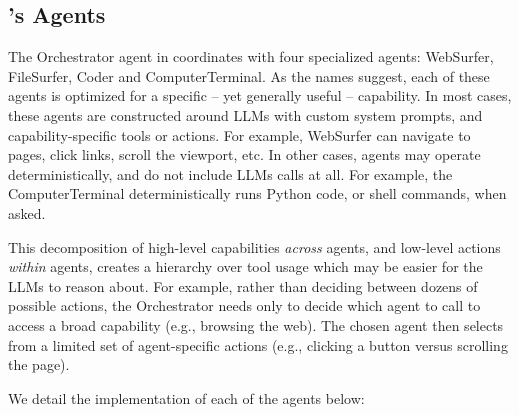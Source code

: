 \subsection{\team's Agents}


The Orchestrator agent in \team coordinates with four specialized agents: WebSurfer, FileSurfer, Coder and ComputerTerminal. As the names suggest, each of these agents is optimized for a specific -- yet generally useful -- capability. In most cases, these agents are constructed around LLMs with custom system prompts, and capability-specific tools or actions. For example, WebSurfer can navigate to pages, click links, scroll the viewport, etc. In other cases, agents may operate deterministically, and do not include LLMs calls at all. For example, the ComputerTerminal deterministically runs Python code, or shell commands, when asked. 

This decomposition of high-level capabilities \emph{across} agents, and low-level actions \emph{within} agents, creates a hierarchy over tool usage which may be easier for the LLMs to reason about. For example, rather than deciding between dozens of possible actions, the Orchestrator needs only to decide which agent to call to access a broad capability (e.g., browsing the web). The chosen agent then selects from a limited set of agent-specific actions (e.g., clicking a button versus scrolling the page). 

We detail the implementation of each of the agents below:

